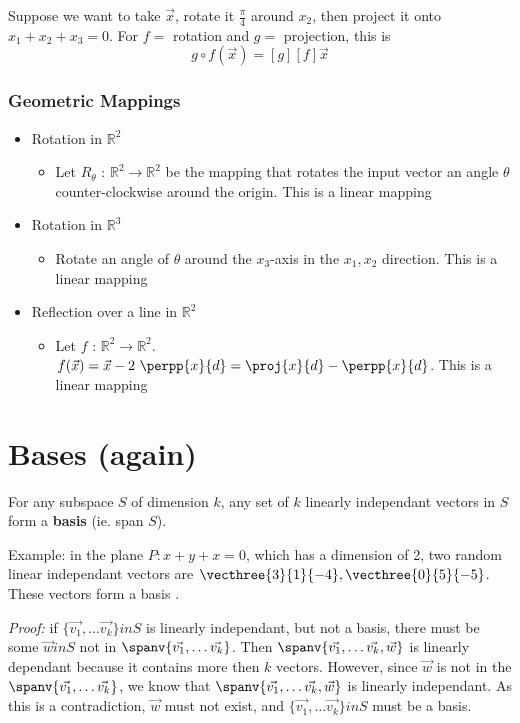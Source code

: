 \documentclass[12pt]{article}
\newcommand{\R}[1]{\mathbb{R}^{#1}}
\begin{document}
Suppose we want to take $\vec{x}$, rotate it $\frac{\pi}{4}$ around $x_2$, then project it onto $x_1 + x_2 + x_3 = 0$. For $f=$ rotation and $g=$ projection, this is \[ g\circ f(\vec{x}) = [g][f]\vec{x} \]

\subsubsection*{Geometric Mappings}
\begin{itemize}
\item{Rotation in $\R{2}$}
\begin{itemize}
\item{Let $R_\theta$ : $\R{2} \to \R{2}$ be the mapping that rotates the input vector an angle $\theta$ counter-clockwise around the origin. This is a linear mapping}
\end{itemize}
\item{Rotation in $\R{3}$}
\begin{itemize}
\item{Rotate an angle of $\theta$ around the $x_3$-axis in the $x_1,x_2$ direction. This is a linear mapping}
\end{itemize}
\item{Reflection over a line in $\R{2}$}
\begin{itemize}
\item{Let $f$ : $\R{2} \to \R{2}$. $f(\vec{x}) = \vec{x} - 2\ \perpp{x}{d} = \proj{x}{d} - \perpp{x}{d}$. This is a linear mapping}
\end{itemize}
\end{itemize}

\section*{Bases (again)}
For any subspace $S$ of dimension $k$, any set of $k$ linearly independant vectors in $S$ form a {\bf basis} (ie. span $S$).

Example: in the plane $P: x + y + x = 0$, which has a dimension of 2, two random linear independant vectors are $\vecthree{3}{1}{-4},\vecthree{0}{5}{-5}$. These vectors form a basis .

\textit{Proof:} if $\{\vec{v_1},\dots \vec{v_k}\}in S$ is linearly independant, but not a basis, there must be some $\vec{w}in S$ not in $\spanv{\vec{v_1},\dots \vec{v_k}}$. Then $\spanv{\vec{v_1},\dots \vec{v_k}, \vec{w}}$ is linearly dependant because it contains more then $k$ vectors. However, since $\vec{w}$ is not in the $\spanv{\vec{v_1},\dots \vec{v_k}}$, we know that $\spanv{\vec{v_1},\dots \vec{v_k}, \vec{w}}$ is linearly independant. As this is a contradiction, $\vec{w}$ must not exist, and $\{\vec{v_1},\dots \vec{v_k}\}in S$ must be a basis.
\end{document}

